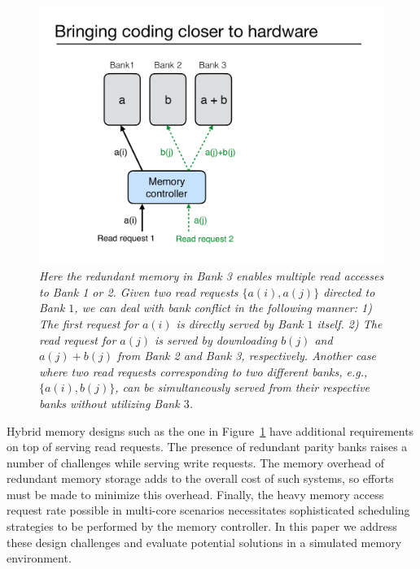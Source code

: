 \begin{figure}[t!]
\centering
\includegraphics[width=0.395\linewidth]{fig/example-xor.pdf}
\caption{\it{Here the redundant memory in Bank 3 enables multiple read accesses to Bank 1 or 2. Given two read requests $\{a(i), a(j)\}$ directed to Bank $1$, we can deal with bank conflict in the following manner: 1) The first request for $a(i)$ is directly served by Bank $1$ itself.  2) The read request for $a(j)$ is served by downloading $b(j)$ and $a(j) + b(j)$ from Bank 2 and Bank 3, respectively. Another case where two read requests corresponding to two different banks, e.g., $\{a(i), b(j)\}$, can be simultaneously served from their respective banks without utilizing Bank $3$.}}
\label{fig:example_xor}
\end{figure}
Hybrid memory designs such as the one in Figure~\ref{fig:example_xor} have additional requirements on top of serving read requests. The presence of redundant parity banks raises a number of challenges while serving write requests. The memory overhead of redundant memory storage adds to the overall cost of such systems, so efforts must be made to minimize this overhead. Finally, the heavy memory access request rate possible in multi-core scenarios necessitates sophisticated scheduling strategies to be performed by the memory controller. In this paper we address these design challenges and evaluate potential solutions in a simulated memory environment. 

